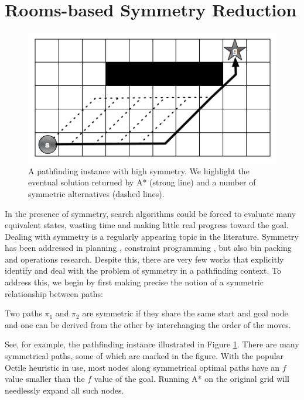 \section{Rooms-based Symmetry Reduction}
\begin{figure}[]
       \begin{center}
                       \includegraphics[scale=0.40]{diagrams/symmetry_example.png}
       \end{center}
       \caption{A pathfinding instance with high symmetry. We highlight the
eventual solution returned by A* (strong line) and a number of symmetric 
alternatives (dashed lines).}
       \label{fig-symmetry}
		\vspace{-0.5em}
\end{figure}
In the presence of symmetry, search algorithms could be forced to evaluate 
many equivalent states, wasting time and making little real progress toward the
goal.
Dealing with symmetry is a regularly appearing topic in the literature. 
Symmetry has been addressed in planning \cite{},
constraint programming \cite{},
but also bin packing and operations research. 
Despite this, there are very few works that explicitly identify and deal with the 
problem of symmetry in a pathfinding context. To address this, we begin by first
making precise the notion of a symmetric relationship between paths:
\begin{definition}
Two paths $\pi_{1}$ and $\pi_{2}$ are symmetric if they share the same start and
goal node and one can be derived from the other by interchanging the order of the
moves.
\end{definition}

See, for example, the pathfinding instance illustrated in Figure \ref{fig-symmetry}.
There are many symmetrical paths, some of which are marked in the figure.
With the popular Octile heuristic in use,
most nodes along symmetrical optimal paths have an $f$ 
value smaller than the $f$ value of the goal. 
Running A* on the original grid will needlessly expand all such nodes.

